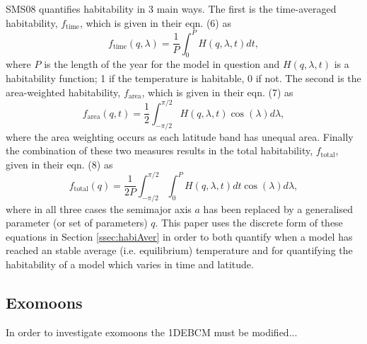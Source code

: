 \documentclass[12pt, onecolumn]{revtex4-2}    %
\begin{document}
SMS08 quantifies habitability in 3 main ways.
The first is the time-averaged habitability, $f_\text{time}$, which is given in their eqn. (6) as
\begin{equation}
  f_\text{time}(q, \lambda) = \frac{1}{P} \int_{0}^{P} H(q, \lambda, t) dt,
  \label{eqn:timeaverage}
\end{equation}
where $P$ is the length of the year for the model in question and $H(q, \lambda, t)$ is a habitability function; 1 if the temperature is habitable, 0 if not.
The second is the area-weighted habitability, $f_\text{area}$, which is given in their eqn. (7) as
\begin{equation}
  f_\text{area}(q, t) = \frac{1}{2} \int_{-\pi/2}^{\pi/2} H(q, \lambda, t) \cos(\lambda)d\lambda,
  \label{eqn:areaaverage}
\end{equation}
where the area weighting occurs as each latitude band has unequal area.
Finally the combination of these two measures results in the total habitability, $f_\text{total}$, given in their eqn. (8) as
\begin{equation}
  f_\text{total}(q) = \frac{1}{2P} \int_{-\pi/2}^{\pi/2} \int_{0}^{P} H(q, \lambda, t) dt \cos(\lambda)d\lambda,
  \label{eqn:totalaverage}
\end{equation}
where in all three cases the semimajor axis $a$ has been replaced by a generalised parameter (or set of parameters) $q$.
This paper uses the discrete form of these equations in Section \ref{ssec:habiAver} in order to both quantify when a model has reached an stable average (i.e. equilibrium) temperature and for quantifying the habitability of a model which varies in time and latitude.

\subsection{Exomoons}
In order to investigate exomoons the 1DEBCM must be modified...
\end{document}
